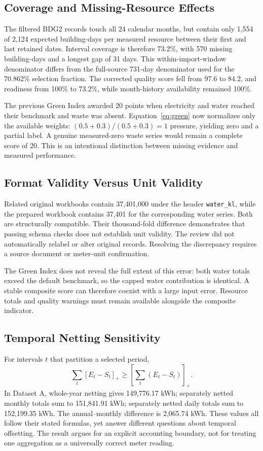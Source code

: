 \documentclass[conference]{IEEEtran}
\newcommand{\pos}[1]{\left[#1\right]_{+}}
\begin{document}
\subsection{Coverage and Missing-Resource Effects}
The filtered BDG2 records touch all 24 calendar months, but contain only 1,554 of 2,124 expected building-days per measured resource between their first and last retained dates. Interval coverage is therefore 73.2\%, with 570 missing building-days and a longest gap of 31 days. This within-import-window denominator differs from the full-source 731-day denominator used for the 70.862\% selection fraction. The corrected quality score fell from 97.6 to 84.2, and readiness from 100\% to 73.2\%, while month-history availability remained 100\%.

The previous Green Index awarded 20 points when electricity and water reached their benchmark and waste was absent. Equation~\ref{eq:green} now normalizes only the available weights: $(0.5+0.3)/(0.5+0.3)=1$ pressure, yielding zero and a partial label. A genuine measured-zero waste series would remain a complete score of 20. This is an intentional distinction between missing evidence and measured performance.

\subsection{Format Validity Versus Unit Validity}
Related original workbooks contain 37,401,000 under the header \texttt{water\_kl}, while the prepared workbook contains 37,401 for the corresponding water series. Both are structurally compatible. Their thousand-fold difference demonstrates that passing schema checks does not establish unit validity. The review did not automatically relabel or alter original records. Resolving the discrepancy requires a source document or meter-unit confirmation.

The Green Index does not reveal the full extent of this error: both water totals exceed the default benchmark, so the capped water contribution is identical. A stable composite score can therefore coexist with a large input error. Resource totals and quality warnings must remain available alongside the composite indicator.

\subsection{Temporal Netting Sensitivity}
For intervals $t$ that partition a selected period,
\begin{equation}
\sum_t\pos{E_t-S_t}\geq\pos{\sum_t(E_t-S_t)}.
\end{equation}
In Dataset A, whole-year netting gives 149,776.17 kWh; separately netted monthly totals sum to 151,841.91 kWh; separately netted daily totals sum to 152,199.35 kWh. The annual--monthly difference is 2,065.74 kWh. These values all follow their stated formulas, yet answer different questions about temporal offsetting. The result argues for an explicit accounting boundary, not for treating one aggregation as a universally correct meter reading.
\end{document}
